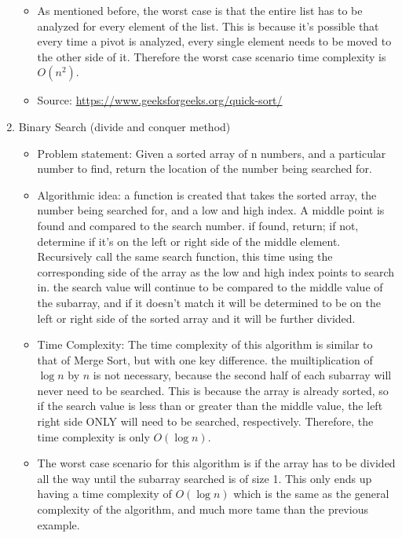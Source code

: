 \documentclass[11pt]{article}
\begin{document}
\begin{enumerate}
\begin{itemize}
\item As mentioned before, the worst case is that the entire list has to be analyzed for every element of the list. This is because it's possible that every time a pivot is analyzed, every single element needs to be moved to the other side of it. Therefore the worst case scenario time complexity is $O(n^2)$.

\item Source: \url{https://www.geeksforgeeks.org/quick-sort/}
\end{itemize}

\item Binary Search (divide and conquer method)

\begin{itemize}
\item Problem statement: Given a sorted array of n numbers, and a particular number to find, return the location of the number being searched for.

\item Algorithmic idea: a function is created that takes the sorted array, the number being searched for, and a low and high index. A middle point is found and compared to the search number. if found, return; if not, determine if it's on the left or right side of the middle element. Recursively call the same search function, this time using the corresponding side of the array as the low and high index points to search in. the search value will continue to be compared to the middle value of the subarray, and if it doesn't match it will be determined to be on the left or right side of the sorted array and it will be further divided.

\item Time Complexity: The time complexity of this algorithm is similar to that of Merge Sort, but with one key difference. the muiltiplication of $\log n$ by $n$ is not necessary, because the second half of each subarray will never need to be searched. This is because the array is already sorted, so if the search value is less than or greater than the middle value, the left right side ONLY will need to be searched, respectively. Therefore, the time complexity is only $O(\log n)$.

\item The worst case scenario for this algorithm is if the array has to be divided all the way until the subarray searched is of size 1. This only ends up having a time complexity of $O(\log n)$ which is the same as the general complexity of the algorithm, and much more tame than the previous example.


\end{itemize}
\end{enumerate}
\end{document}
